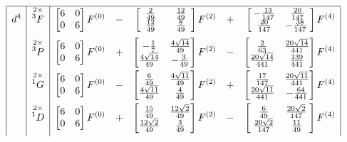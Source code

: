 \begin{table}
\begin{equation*}
\begin{array}{|>{\displaystyle}c|>{\displaystyle}c|>{\displaystyle}r >{\displaystyle}c >{\displaystyle}r >{\displaystyle}c >{\displaystyle}r|}
\hline
d^4 & \stackrel{2\times}{^3F} & \begin{bmatrix}6 & 0 \\ 0 & 6\end{bmatrix} F^{(0)} & - & \begin{bmatrix}\phantom{0}\frac{2}{49}\phantom{0} & \phantom{0}\frac{12}{49}\phantom{0} \\ \frac{12}{49} & \frac{8}{49}\end{bmatrix} F^{(2)} & + & \begin{bmatrix}\,-\frac{13}{147} & \frac{20}{147} \\ \,\frac{20}{147} & -\frac{38}{147}\phantom{,}\end{bmatrix} F^{(4)} \\[1.2em]
    & \stackrel{2\times}{^3P} & \begin{bmatrix}6 & 0 \\ 0 & 6\end{bmatrix} F^{(0)} & + & \begin{bmatrix}-\frac{1}{7} & \frac{4\sqrt{14}}{49} \\ \frac{4\sqrt{14}}{49} & -\frac{3}{49}\end{bmatrix} F^{(2)} & - & \begin{bmatrix}\frac{2}{63} & \frac{20\sqrt{14}}{441} \\ \frac{20\sqrt{14}}{441} & \frac{139}{441}\end{bmatrix} F^{(4)} \\[1.2em]
    & \stackrel{2\times}{^1G} & \begin{bmatrix}6 & 0 \\ 0 & 6\end{bmatrix} F^{(0)} & - & \begin{bmatrix}\frac{6}{49} & \frac{4\sqrt{11}}{49} \\ \frac{4\sqrt{11}}{49} & \frac{4}{49}\end{bmatrix} F^{(2)} & + & \begin{bmatrix}\frac{17}{147} & \frac{20\sqrt{11}}{441} \\ \frac{20\sqrt{11}}{441} & -\frac{64}{441}\end{bmatrix} F^{(4)} \\[1.2em]
    & \stackrel{2\times}{^1D} & \begin{bmatrix}6 & 0 \\ 0 & 6\end{bmatrix} F^{(0)} & + & \begin{bmatrix}\frac{15}{49} & \frac{12\sqrt{2}}{49} \\ \frac{12\sqrt{2}}{49} & \frac{3}{49}\end{bmatrix} F^{(2)} & - & \begin{bmatrix}\phantom{,}\frac{6}{49} & \,\frac{20\sqrt{2}}{147}\phantom{,} \\ \phantom{,}\frac{20\sqrt{2}}{147} & \frac{11}{49}\end{bmatrix} F^{(4)} \\[1.2em]

\end{array}
\end{equation*}
\end{table}
